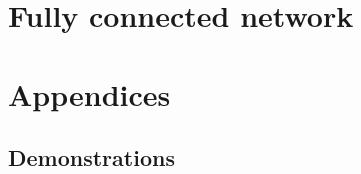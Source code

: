 \documentclass[12pt, titlepage]{report}
\begin{document}
  \chapter{Fully connected network}\label{chapter : fully connected network}
  

%  
  \chapter{Appendices}
  \section{Demonstrations}
  
  \printbibliography
\end{document}
